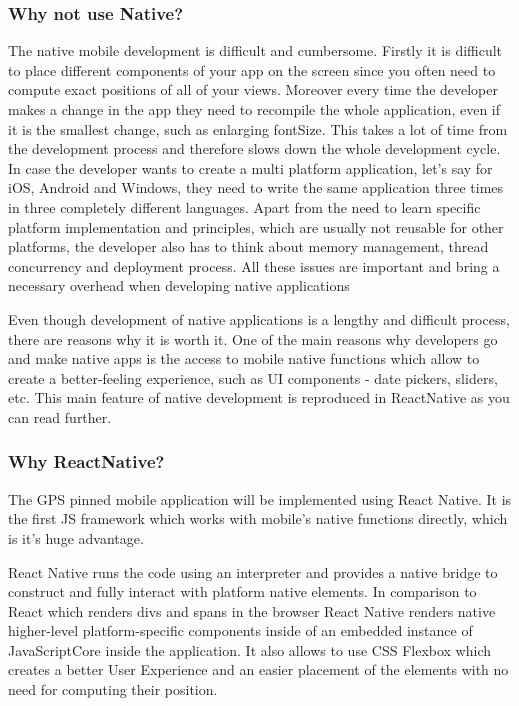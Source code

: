\documentclass[thesis=M,english]{FITthesis}[2012/10/20]
\begin{document}
\subsubsection{Why not use Native?}
The native mobile development is difficult and cumbersome. Firstly it is difficult to place different components of your app on the screen since you often need to compute exact positions of all of your views. Moreover every time the developer makes a change in the app they need to recompile the whole application, even if it is the smallest change, such as enlarging fontSize. This takes a lot of time from the development process and therefore slows down the whole development cycle. In case the developer wants to create a multi platform application, let's say for iOS, Android and Windows, they need to write the same application three times in three completely different languages. Apart from the need to learn specific platform implementation and principles, which are usually not reusable for other platforms, the developer also has to think about memory management, thread concurrency and deployment process. All these issues are important and bring a necessary overhead when developing native applications

Even though development of native applications is a lengthy and difficult process, there are reasons why it is worth it. One of the main reasons why developers go and make native apps is the access to mobile native functions which allow to create a better-feeling experience, such as UI components - date pickers, sliders, etc. This main feature of native development is reproduced in ReactNative as you can read further.

\subsubsection{Why ReactNative?}

The GPS pinned mobile application will be implemented using React Native. It is the first JS framework which works with mobile's native functions directly, which is it's huge advantage.

React Native runs the code using an interpreter and provides a native bridge to construct and fully interact with platform native elements. In comparison to React which renders divs and spans in the browser React Native renders native higher-level platform-specific components inside of an embedded instance of JavaScriptCore inside the application. It also allows to use CSS Flexbox which creates a better User Experience and an easier placement of the elements with no need for computing their position.
\end{document}
